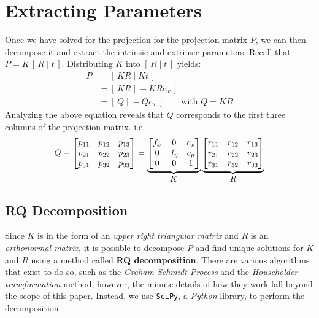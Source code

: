 \section{Extracting Parameters} \label{sec:extract}

Once we have solved for the projection for the projection matrix $P$, we can then decompose it and extract the intrinsic and extrinsic parameters. Recall that $P = K\,[\,R\;|\;t\,]$. Distributing $K$ into $[\,R\;|\;t\,]$ yields:
\begin{align} \label{eq:param}
    P & = [\,KR\;|\;Kt\,]     \nonumber                     \\
      & = [\,KR\;|\;-KRc_w\,]  \nonumber                    \\
      & = [\,Q\;|\;-Qc_w\,]      \qquad \text{with } Q = KR
\end{align}
Analyzing the above equation reveals that $Q$ corresponds to the first three columns of the projection matrix. i.e.
\begin{equation*}
    Q \equiv
    \begin{bmatrix}
        p_{11} & p_{12} & p_{13} \\
        p_{21} & p_{22} & p_{23} \\
        p_{31} & p_{32} & p_{33}
    \end{bmatrix}
    =
    \underbrace{
        \begin{bmatrix}
            f_x & 0   & c_x \\
            0   & f_y & c_y \\
            0   & 0   & 1
        \end{bmatrix}
    }_{\mathlarger{K}}
    \underbrace{
        \begin{bmatrix}
            r_{11} & r_{12} & r_{13} \\
            r_{21} & r_{22} & r_{23} \\
            r_{31} & r_{32} & r_{33} \\
        \end{bmatrix}
    }_{\mathlarger{R}}
\end{equation*}

\subsection{RQ Decomposition} \label{subsec:rq}
Since $K$ is in the form of an \emph{upper right triangular matrix} and $R$ is an \emph{orthonormal matrix}, it is possible to decompose $P$ and find unique solutions for $K$ and $R$ using a method called \textbf{RQ decomposition}. There are various algorithms that exist to do so, such as the \emph{Graham-Schmidt Process} and the \emph{Householder transformation} method, however, the minute details of how they work fall beyond the scope of this paper. Instead, we use \texttt{SciPy}, a \emph{Python} library, to perform the decomposition.

